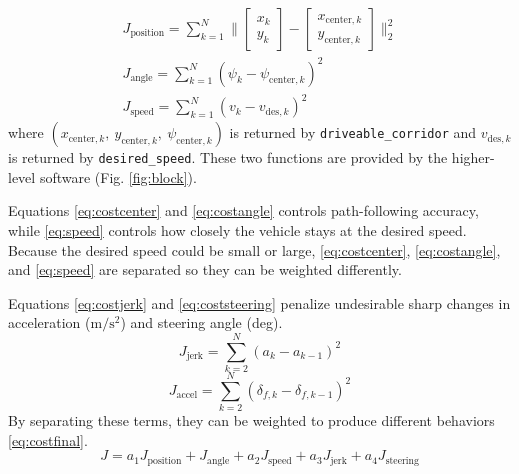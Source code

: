 \documentclass[letterpaper, 10 pt, conference]{ieeeconf}  %
\begin{document}
 \begin{gather}
 J_{\text{position}} = \sum_{k=1}^N\big\| \begin{bmatrix}
 x_k\\y_k
 \end{bmatrix} - \begin{bmatrix}
 x_{\text{center},k}\\y_{\text{center},k}
 \end{bmatrix} \big\|_2^2
  \label{eq:costcenter}
 \\
 J_{\text{angle}} = \sum_{k=1}^N (\psi_k - \psi_{\text{center},k})^2
 \label{eq:costangle}
 \\
  J_{\text{speed}} = \sum_{k=1}^N (v_k - v_{\text{des},k})^2
 \label{eq:speed}
 \end{gather}
 where $(x_{\text{center},k},\ y_{\text{center},k},\ \psi_{\text{center},k})$ is returned by \texttt{driveable\_corridor} and $v_{\text{des},k}$ is returned by \texttt{desired\_speed}. These two functions are provided by the higher-level software (Fig. \ref{fig:block}).
 
 
 
 Equations \eqref{eq:costcenter} and \eqref{eq:costangle} controls path-following accuracy, while \eqref{eq:speed} controls how closely the vehicle stays at the desired speed. Because the desired speed could be small or large, \eqref{eq:costcenter}, \eqref{eq:costangle}, and \eqref{eq:speed} are separated so they can be weighted differently.
 
 
 Equations \eqref{eq:costjerk} and \eqref{eq:coststeering} penalize undesirable sharp changes in acceleration ($\text{m}/\text{s}^2$) and steering angle (deg).
 \vspace{-0.25em} 
 \begin{equation}
 J_{\text{jerk}} = \sum_{k=2}^N (a_k - a_{k-1})^2
 \label{eq:costjerk}
 \end{equation}
 \vspace{-0.25em}
 \begin{equation}
 J_{\text{accel}} = \sum_{k=2}^N (\delta_{f,k} - \delta_{f,k-1})^2
 \label{eq:coststeering}
 \end{equation}
  \vspace{-0.25em} 
 By separating these terms, they can be weighted to produce different behaviors \eqref{eq:costfinal}.
 \begin{equation}
 J = a_1 J_{\text{position}} + J_{\text{angle}} + a_2 J_{\text{speed}} + a_3 J_{\text{jerk}} + a_4 J_{\text{steering}}
 \label{eq:costfinal}
 \end{equation}
 
\end{document}
